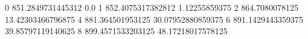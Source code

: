 0 851.2849731445312 0.0
1 852.4075317382812 1.12255859375
2 864.7080078125 13.42303466796875
4 881.364501953125 30.07952880859375
6 891.1429443359375 39.85797119140625
8 899.4571533203125 48.17218017578125
